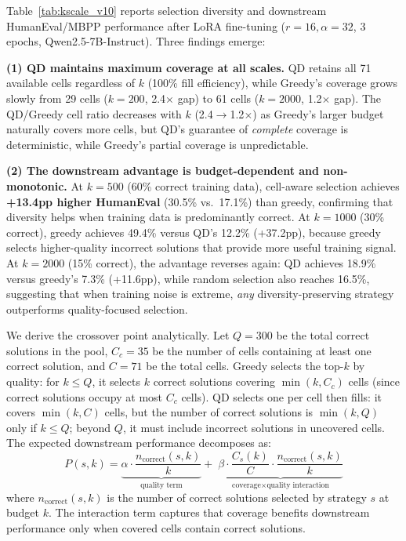 \documentclass{article}
\begin{document}
\begin{enumerate}[nosep]
Table~\ref{tab:kscale_v10} reports selection diversity and downstream HumanEval/MBPP performance after LoRA fine-tuning ($r{=}16, \alpha{=}32$, 3 epochs, Qwen2.5-7B-Instruct).
Three findings emerge:

\textbf{(1) QD maintains maximum coverage at all scales.}
QD retains all 71 available cells regardless of $k$ (100\% fill efficiency), while Greedy's coverage grows slowly from 29 cells ($k{=}200$, 2.4$\times$ gap) to 61 cells ($k{=}2000$, 1.2$\times$ gap).
The QD/Greedy cell ratio decreases with $k$ (2.4$\to$1.2$\times$) as Greedy's larger budget naturally covers more cells, but QD's guarantee of \emph{complete} coverage is deterministic, while Greedy's partial coverage is unpredictable.

\textbf{(2) The downstream advantage is budget-dependent and non-monotonic.}
At $k{=}500$ (60\% correct training data), cell-aware selection achieves \textbf{+13.4pp higher HumanEval} (30.5\% vs.\ 17.1\%) than greedy, confirming that diversity helps when training data is predominantly correct.
At $k{=}1000$ (30\% correct), greedy achieves 49.4\% versus QD's 12.2\% (+37.2pp), because greedy selects higher-quality incorrect solutions that provide more useful training signal.
At $k{=}2000$ (15\% correct), the advantage reverses again: QD achieves 18.9\% versus greedy's 7.3\% (+11.6pp), while random selection also reaches 16.5\%, suggesting that when training noise is extreme, \emph{any} diversity-preserving strategy outperforms quality-focused selection.

We derive the crossover point analytically. Let $Q = 300$ be the total correct solutions in the pool, $C_c = 35$ be the number of cells containing at least one correct solution, and $C = 71$ be the total cells.
Greedy selects the top-$k$ by quality: for $k \leq Q$, it selects $k$ correct solutions covering $\min(k, C_c)$ cells (since correct solutions occupy at most $C_c$ cells).
QD selects one per cell then fills: it covers $\min(k, C)$ cells, but the number of correct solutions is $\min(k, Q)$ only if $k \leq Q$; beyond $Q$, it must include incorrect solutions in uncovered cells.
The expected downstream performance decomposes as:
\begin{equation}
P(s, k) = \underbrace{\alpha \cdot \frac{n_{\text{correct}}(s,k)}{k}}_{\text{quality term}} + \;\underbrace{\beta \cdot \frac{C_s(k)}{C} \cdot \frac{n_{\text{correct}}(s,k)}{k}}_{\text{coverage$\times$quality interaction}}
\label{eq:tradeoff}
\end{equation}
where $n_{\text{correct}}(s,k)$ is the number of correct solutions selected by strategy $s$ at budget $k$.
The interaction term captures that coverage benefits downstream performance only when covered cells contain correct solutions.


\end{enumerate}
\end{document}
